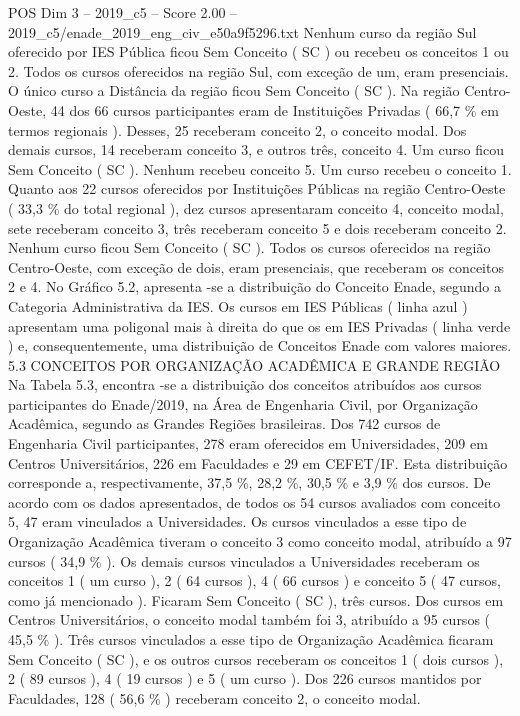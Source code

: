 \begin{textsample}{POS Dim 3 – 2019\_c5 – Score 2.00 – 2019\_c5/enade\_2019\_eng\_civ\_e50a9f5296.txt}
Nenhum curso da região Sul oferecido por IES Pública ficou Sem Conceito ( SC ) ou recebeu os conceitos 1 ou 2.
Todos os cursos oferecidos na região Sul, com exceção de um, eram presenciais.
O único curso a Distância da região ficou Sem Conceito ( SC ).
Na região Centro-Oeste, 44 dos 66 cursos participantes eram de Instituições Privadas ( 66,7 \% em termos regionais ).
Desses, 25 receberam conceito 2, o conceito modal.
Dos demais cursos, 14 receberam conceito 3, e outros três, conceito 4.
Um curso ficou Sem Conceito ( SC ).
Nenhum recebeu conceito 5.
Um curso recebeu o conceito 1.
Quanto aos 22 cursos oferecidos por Instituições Públicas na região Centro-Oeste ( 33,3 \% do total regional ), dez cursos apresentaram conceito 4, conceito modal, sete receberam conceito 3, três receberam conceito 5 e dois receberam conceito 2.
Nenhum curso ficou Sem Conceito ( SC ).
Todos os cursos oferecidos na região Centro-Oeste, com exceção de dois, eram presenciais, que receberam os conceitos 2 e 4.
No Gráfico 5.2, apresenta -se a distribuição do Conceito Enade, segundo a Categoria Administrativa da IES.
Os cursos em IES Públicas ( linha azul ) apresentam uma poligonal mais à direita do que os em IES Privadas ( linha verde ) e, consequentemente, uma distribuição de Conceitos Enade com valores maiores. 5.3 CONCEITOS POR ORGANIZAÇÃO ACADÊMICA E GRANDE REGIÃO Na Tabela 5.3, encontra -se a distribuição dos conceitos atribuídos aos cursos participantes do Enade/2019, na Área de Engenharia Civil, por Organização Acadêmica, segundo as Grandes Regiões brasileiras.
Dos 742 cursos de Engenharia Civil participantes, 278 eram oferecidos em Universidades, 209 em Centros Universitários, 226 em Faculdades e 29 em CEFET/IF.
Esta distribuição corresponde a, respectivamente, 37,5 \%, 28,2 \%, 30,5 \% e 3,9 \% dos cursos.
De acordo com os dados apresentados, de todos os 54 cursos avaliados com conceito 5, 47 eram vinculados a Universidades.
Os cursos vinculados a esse tipo de Organização Acadêmica tiveram o conceito 3 como conceito modal, atribuído a 97 cursos ( 34,9 \% ).
Os demais cursos vinculados a Universidades receberam os conceitos 1 ( um curso ), 2 ( 64 cursos ), 4 ( 66 cursos ) e conceito 5 ( 47 cursos, como já mencionado ).
Ficaram Sem Conceito ( SC ), três cursos.
Dos cursos em Centros Universitários, o conceito modal também foi 3, atribuído a 95 cursos ( 45,5 \% ).
Três cursos vinculados a esse tipo de Organização Acadêmica ficaram Sem Conceito ( SC ), e os outros cursos receberam os conceitos 1 ( dois cursos ), 2 ( 89 cursos ), 4 ( 19 cursos ) e 5 ( um curso ).
Dos 226 cursos mantidos por Faculdades, 128 ( 56,6 \% ) receberam conceito 2, o conceito modal.

\end{textsample}

